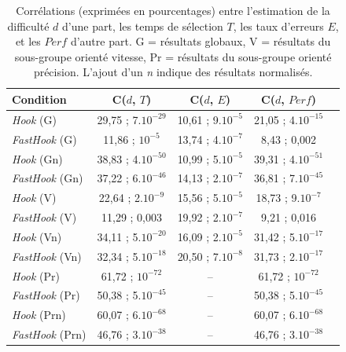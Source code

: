 	
\begin{table}
	\centering
	\begin{tabular}{l | c c c c}
		Condition				& C($d$, $T$)			& C($d$, $E$)			& C($d$, $Perf$)		\bigstrut[b] \\ \hline
		\emph{Hook} (G)			& 29,75 ; 7$.10^{-29}$	& 10,61 ; 9$.10^{-5}$	& 21,05 ; 4$.10^{-15}$	\bigstrut[t] \\
		\emph{FastHook} (G)		& 11,86 ; $10^{-5}$		& 13,74 ; 4$.10^{-7}$	& 8,43 ; 0,002			\\
		\emph{Hook} (Gn)		& 38,83 ; 4$.10^{-50}$	& 10,99 ; 5$.10^{-5}$	& 39,31 ; 4$.10^{-51}$	\\
		\emph{FastHook} (Gn)	& 37,22 ; 6$.10^{-46}$	& 14,13 ; 2$.10^{-7}$	& 36,81 ; 7$.10^{-45}$	\\
		\emph{Hook} (V)			& 22,64 ; 2$.10^{-9}$	& 15,56 ; 5$.10^{-5}$	& 18,73 ; 9$.10^{-7}$	\\
		\emph{FastHook} (V)		& 11,29 ; 0,003			& 19,92 ; 2$.10^{-7}$	& 9,21 ; 0,016			\\
		\emph{Hook} (Vn)		& 34,11 ; 5$.10^{-20}$	& 16,09 ; 2$.10^{-5}$	& 31,42 ; 5$.10^{-17}$	\\
		\emph{FastHook} (Vn)	& 32,34 ; 5$.10^{-18}$	& 20,50 ; 7$.10^{-8}$	& 31,73 ; 2$.10^{-17}$	\\
		\emph{Hook} (Pr)		& 61,72 ; $10^{-72}$	& --					& 61,72 ; $10^{-72}$	\\
		\emph{FastHook} (Pr)	& 50,38 ; 5$.10^{-45}$	& --					& 50,38 ; 5$.10^{-45}$	\\
		\emph{Hook} (Prn)		& 60,07 ; 6$.10^{-68}$	& --					& 60,07 ; 6$.10^{-68}$	\\
		\emph{FastHook} (Prn)	& 46,76 ; 3$.10^{-38}$	& --					& 46,76 ; 3$.10^{-38}$	\\
	\end{tabular}
	\caption[\emph{Hook} et \emph{FastHook} -- corrélations]{Corrélations (exprimées en pourcentages) entre l'estimation de la difficulté $d$ d'une part, les temps de sélection $T$, les taux d'erreurs $E$, et les $Perf$ d'autre part. G = résultats globaux, V = résultats du sous-groupe orienté vitesse, Pr = résultats du sous-groupe orienté précision. L'ajout d'un \emph{n} indique des résultats normalisés.}
	\label{tab:fastHookCorr}
\end{table}
	
	
